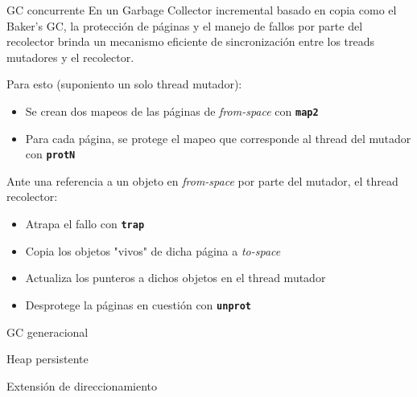\documentclass[xcolor=pdftex,dvipsnames,usenames,table]{beamer}
\begin{document}
\begin{frame}{GC concurrente}
\pause En un Garbage Collector incremental basado en copia como el Baker's GC, la protección de páginas y el manejo de fallos por parte del recolector brinda un mecanismo eficiente de sincronización entre los treads mutadores y el recolector.

\pause Para esto (suponiento un solo thread mutador):
	\pause
	\begin{itemize}
		\item Se crean dos mapeos de las páginas de \emph{from-space} con \textbf{\texttt{map2}}
		\item Para cada página, se protege el mapeo que corresponde al thread del mutador con \textbf{\texttt{protN}}
	\end{itemize}

\pause Ante una referencia a un objeto en \emph{from-space} por parte del mutador, el thread recolector:
	\pause
	\begin{itemize}
		\item Atrapa el fallo con \textbf{\texttt{trap}}
		\item Copia los objetos "vivos" de dicha página a \emph{to-space}
		\item Actualiza los punteros a dichos objetos en el thread mutador
		\item Desprotege la páginas en cuestión con \textbf{\texttt{unprot}}
	\end{itemize}

\end{frame}

\begin{frame}{GC generacional}
\end{frame}

\begin{frame}{Heap persistente}
\end{frame}

\begin{frame}{Extensión de direccionamiento}
\end{frame}
\end{document}
